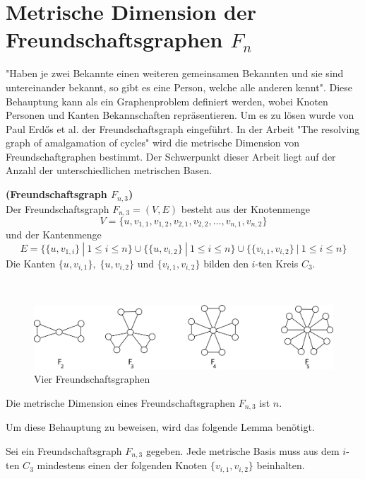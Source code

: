 \section{Metrische Dimension der Freundschaftsgraphen $F_{n}$}
\vspace{-3mm}
"Haben je zwei Bekannte einen weiteren gemeinsamen Bekannten und sie sind untereinander bekannt, so gibt es eine Person, welche alle anderen kennt". Diese Behauptung kann als ein Graphenproblem definiert werden, wobei Knoten Personen und Kanten Bekannschaften repräsentieren. Um es zu lösen wurde von Paul Erdős et al. \cite{Erdos} der Freundschaftsgraph eingeführt. In der Arbeit "The resolving graph of amalgamation of cycles" \cite{amal} wird die metrische Dimension von Freundschaftgraphen bestimmt. Der Schwerpunkt dieser Arbeit liegt auf der Anzahl der unterschiedlichen metrischen Basen.
\begin{defi}{\textbf{(Freundschaftsgraph $F_{n,3}$)}}\\
Der Freundschaftsgraph $F_{n,3}=(V,E)$ besteht aus der Knotenmenge $$V = \{u,v_{1,1},v_{1,2},v_{2,1},v_{2,2},\ldots,v_{n,1},v_{n,2}\}$$ und der Kantenmenge $$E = \{ \{u,v_{1,i}\}~|~ 1 \leq i \leq n \} \cup \{ \{u,v_{i,2}\}~|~ 1 \leq i \leq n \} \cup \{ \{ v_{i,1}, v_{i,2} \} ~|~ 1 \leq i \leq n \}$$
Die Kanten $\{u,v_{i,1}\},\;\{u,v_{i,2}\}$ und $\{v_{i,1},v_{i,2}\}$ bilden den $i$-ten Kreis $C_3$.
\end{defi}
\begin{bsp}~
\vspace{-4mm}
\begin{figure}[h!]
\centering
 		 \includegraphics[width=360pt]{bilder/freunschaftsgraph.pdf}
   \caption{Vier Freundschaftsgraphen}
   \label{bild:fg}
\end{figure}
\vspace{-3mm}
\end{bsp}
\begin{lem}
\label{Freundschaftsgraphen}
Die metrische Dimension eines Freundschaftsgraphen $F_{n,3}$ ist $n$.
\end{lem}
\vspace{-2mm}
Um diese Behauptung zu beweisen, wird das folgende Lemma benötigt. 
\begin{lem}
\label{mindfreundschaftsgraph}
Sei ein Freundschaftsgraph $F_{n,3}$ gegeben. Jede metrische Basis muss aus dem $i$-ten $C_3$ mindestens einen der folgenden Knoten $\{v_{i,1},v_{i,2}\}$ beinhalten. 
\end{lem}
